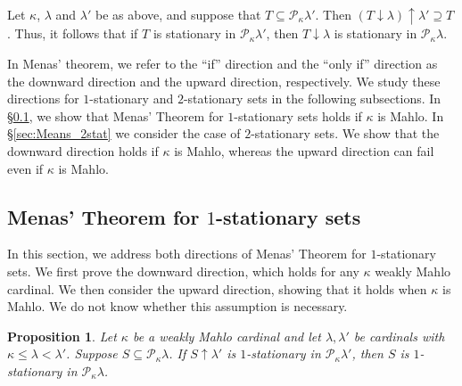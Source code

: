 \documentclass[a4paper,12pt,reqno,oneside]{amsart}
\theoremstyle{plain}
\newtheorem{prop}[theorem]{Proposition}
\newcommand{\mcal}{\mathcal}
\begin{document}
Let $\kappa$, $\lambda$ and $\lambda '$ be as above, and suppose that $T \subseteq \mcal{P}_\kappa \lambda '$. Then $( T \downarrow \lambda ) \uparrow \lambda ' \supseteq T$. Thus, it follows that if $T$ is stationary in $\mcal{P}_\kappa \lambda '$, then $T \downarrow \lambda$ is stationary in $\mcal{P}_\kappa \lambda$.


In Menas' theorem, we refer to the ``if'' direction and the ``only if'' direction as the downward direction and the upward direction, respectively. We study these directions for $1$-stationary and $2$-stationary sets in the following subsections. In \S \ref{sec:Menas_1stat}, we show that Menas' Theorem for $1$-stationary sets holds if $\kappa$ is Mahlo. In \S \ref{sec:Means_2stat} we  consider the case of $2$-stationary sets. We show that the downward direction holds if $\kappa$ is Mahlo, whereas the upward direction can fail even if $\kappa$ is Mahlo.



\subsection{Menas' Theorem for $1$-stationary sets} \label{sec:Menas_1stat}


In this section, we address both directions of Menas' Theorem for $1$-stationary sets. We first prove the downward direction, which holds for any $\kappa$ weakly Mahlo cardinal. We then consider the upward direction, showing that it holds when $\kappa$ is Mahlo. We do not know whether this assumption is necessary.


\begin{prop}\label{mrtl}
Let $\kappa$ be a weakly Mahlo cardinal and let $\lambda , \lambda'$ be cardinals with $\kappa \leq \lambda < \lambda '$. Suppose $S \subseteq \mcal{P}_\kappa \lambda$. If $S \uparrow \lambda '$ is $1$-stationary in $\mcal{P}_{\kappa}\lambda'$, then $S$ is $1$-stationary in $\mcal{P}_{\kappa}{\lambda}$.
\end{prop}
\end{document}
